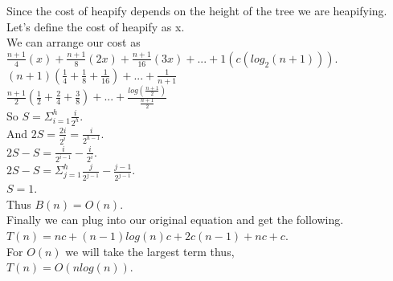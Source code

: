 \documentclass{article}
\begin{document}
Since the cost of heapify depends on the height of the tree we are heapifying. Let's define 
the cost of heapify as x.\\
We can arrange our cost as\\
$\frac{n + 1}{4}(x) + \frac{n + 1}{8}(2x) + \frac{n + 1}{16}(3x) + ... + 1(c (log_{2}(n + 1)))$.\\
$(n + 1)(\frac{1}{4} + \frac{1}{8} + \frac{1}{16}) + ... + \frac{1}{n + 1}$\\
$\frac{n + 1}{2}(\frac{1}{2} + \frac{2}{4} + \frac{3}{8}) + ... + \frac{log(\frac{n + 1}{2})}{\frac{n + 1}{2}}$\\
So $S = \Sigma_{i = 1}^{h} \frac{i}{2^{h}}$.\\
And $2S = \frac{2i}{2^{i}} = \frac{i}{2^{h - 1}}$.\\
$2S - S = \frac{i}{2^{i - 1}} - \frac{i}{2^{i}}$.\\
$2S - S = \Sigma_{j = 1}^{h} \frac{j}{2^{j - 1}} - \frac{j - 1}{2^{j - 1}}$.\\
$S = 1$.\\
Thus $B(n) = O(n)$.\\

Finally we can plug into our original equation and get the following.\\
$T(n) = nc + (n-1)log(n)c + 2c(n - 1) + nc + c$.\\
For $O(n)$ we will take the largest term thus,\\
$T(n) = O(nlog(n))$.\\
\end{document}
